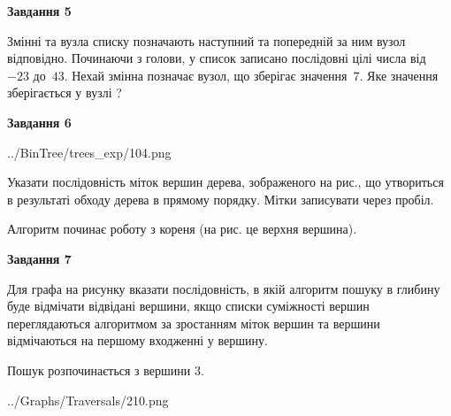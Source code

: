 \documentclass[12pt, ukrainian]{article}
\begin{document}
{\begin {large}
{\begin {center}\textbf{Завдання 5}\end {center}}\par
Змінні  та  вузла списку позначають наступний та попередній за ним вузол відповідно. Починаючи з голови, у список записано послідовні цілі числа від~$-23$ до~$43$. Нехай змінна  позначає вузол, що зберігає значення~$7$.
Яке значення зберігається у вузлі  ?\par
\newpage

{\begin {center}\textbf{Завдання 6}\end {center}}\par

\begin{center}
	{../BinTree/trees_exp/104.png}
\end{center}
Указати послідовність міток вершин дерева, зображеного на рис., що утвориться в результаті обходу дерева в прямому порядку. Мітки записувати через пробіл.\par Алгоритм починає роботу з кореня (на рис. це верхня вершина).\par
\newpage

{\begin {center}\textbf{Завдання 7}\end {center}}\par
Для графа на рисунку вказати послідовність, в якій алгоритм пошуку в глибину буде відмічати відвідані вершини, якщо списки суміжності вершин переглядаються алгоритмом за зростанням міток вершин та вершини відмічаються на першому вход\-женні у вершину.\par
Пошук розпочинається з вершини 3.\par

\begin{center}
	{../Graphs/Traversals/210.png}
\end{center}\par
\newpage


\end{large}}
\end{document}
